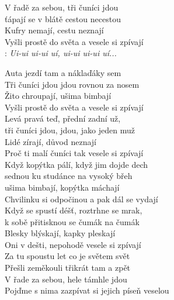 
V řadě za sebou, tři čuníci jdou\\
ťápají se v blátě cestou necestou\\
Kufry nemají, cestu neznají\\
Vyšli prostě do světa a vesele si zpívají\\

\textregistered: \emph{Ui-ui ui-ui uí, ui-ui ui-ui uí...}\\

\begin{Large}

Auta jezdí tam a náklaďáky sem\\
Tři čuníci jdou jdou rovnou za nosem\\
Žito chroupají, ušima bimbají\\
Vyšli prostě do světa a vesele si zpívají \hspace{0.5cm} \textregistered\\

Levá pravá teď, přední zadní už,\\
tři čuníci jdou, jdou, jako jeden muž\\
Lidé zírají, důvod neznají\\
Proč ti malí čuníci tak vesele si zpívají \hspace{0.5cm} \textregistered\\

Když kopýtka pálí, když jim dojde dech\\
sednou ku studánce na vysoký břeh\\
ušima bimbají, kopýtka máchají\\
Chvilinku si odpočinou a pak dál se vydají \hspace{0.5cm} \textregistered\\

Když se spustí déšť, roztrhne se mrak,\\
k sobě přitisknou se čumák na čumák\\
Blesky blýskají, kapky pleskají\\
Oni v dešti, nepohodě vesele si zpívají \hspace{0.5cm} \textregistered\\

Za tu spoustu let co je světem svět\\
Přešli zeměkouli třikrát tam a zpět\\
V řade za sebou, hele támhle jdou\\
Pojďme s nima zazpívat si jejich píseň veselou \hspace{0.5cm} \textregistered

\end{Large}

\newpage
